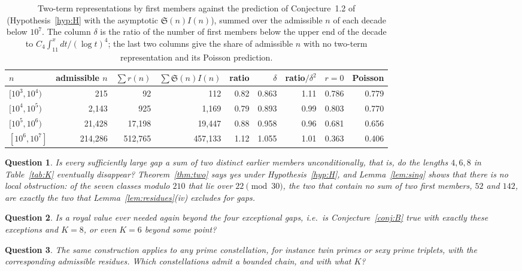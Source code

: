 \documentclass[11pt,a4paper]{article}
\newtheorem{question}{Question}
\begin{document}
\begin{table}[ht]
\centering
\caption{Two-term representations by first members against the prediction
of Conjecture~1.2 of \cite{GreenTao2010} (Hypothesis~\ref{hyp:H} with the
asymptotic $\mathfrak S(n)I(n)$), summed over the admissible $n$ of each
decade below $10^7$. The column $\delta$ is the ratio of the number of
first members below the upper end of the decade to
$C_4\int_{11}^{x}dt/(\log t)^4$; the last two columns give the share of
admissible $n$ with no two-term representation and its Poisson prediction.}
\label{tab:hl}
\small
\begin{tabular}{lrrrrrrrr}
\toprule
$n$ & admissible $n$ & $\sum r(n)$ & $\sum\mathfrak S(n)I(n)$ & ratio & $\delta$ & ratio$/\delta^2$ & $r=0$ & Poisson \\
\midrule
$[10^{3},10^{4})$ & 215 & 92 & 112 & 0.82 & 0.863 & 1.11 & 0.786 & 0.779 \\
$[10^{4},10^{5})$ & 2,143 & 925 & 1,169 & 0.79 & 0.893 & 0.99 & 0.803 & 0.770 \\
$[10^{5},10^{6})$ & 21,428 & 17,198 & 19,447 & 0.88 & 0.958 & 0.96 & 0.681 & 0.656 \\
$[10^{6},10^{7}]$ & 214,286 & 512,765 & 457,133 & 1.12 & 1.055 & 1.01 & 0.363 & 0.406 \\
\bottomrule
\end{tabular}
\end{table}

\begin{question}
Is every sufficiently large gap a sum of \emph{two} distinct earlier
members unconditionally, that is, do the lengths $4,6,8$ in
Table~\ref{tab:K} eventually disappear? Theorem~\ref{thm:two} says yes
under Hypothesis~\ref{hyp:H}, and Lemma~\ref{lem:sing} shows that there is
no local obstruction: of the seven classes modulo $210$ that lie over
$22 \pmod{30}$, the two that contain no sum of two first members, $52$ and
$142$, are exactly the two that Lemma~\ref{lem:residues}(iv) excludes for
gaps.
\end{question}

\begin{question}
Is a royal value ever needed again beyond the four exceptional gaps, i.e.\
is Conjecture~\ref{conj:B} true with exactly these exceptions and $K=8$,
or even $K=6$ beyond some point?
\end{question}

\begin{question}
The same construction applies to any prime constellation, for instance
twin primes or sexy prime triplets, with the corresponding admissible
residues. Which constellations admit a bounded chain, and with what $K$?
\end{question}
\end{document}

